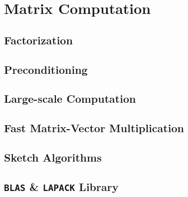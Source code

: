 \chapter{Matrix Computation}
\label{Ch: 8-Mat-Com}
\section{Factorization}

\section{Preconditioning}

\section{Large-scale Computation}

\section{Fast Matrix-Vector Multiplication}

\section{Sketch Algorithms}

\section{\texttt{BLAS} \& \texttt{LAPACK} Library}
